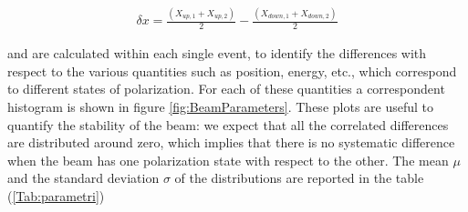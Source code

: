 \begin{align*}
\delta x =  \frac{(X_{up,1} + X_{up,2})}{2} - \frac{(X_{down,1} + X_{down,2})}{2}
\end{align*}

and are calculated within each single event, to identify the differences with respect to the various quantities such as position, energy, etc., which correspond to different states of polarization. For each of these quantities a correspondent histogram is shown in figure \ref{fig:BeamParameters}. These plots are useful to quantify the stability of the beam: we expect that all the correlated differences are distributed around zero, which implies that there is no systematic difference when the beam has one polarization state with respect to the other. The mean $\mu$ and the standard deviation $\sigma$ of the distributions are reported in the table (\ref{Tab:parametri}) 

